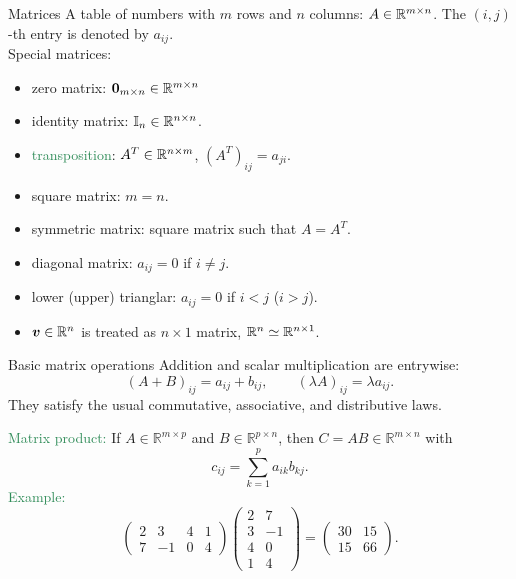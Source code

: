 \documentclass{beamer}
\begin{document}
\begin{frame}{Matrices}
	A table of numbers with $m$ rows and $n$ columns: $A\in \mathbb R^{m\times n}$. The $(i,j)$-th entry is denoted by $a_{ij}$.\\[.3cm]
	Special matrices: 
\begin{itemize}
	\item zero matrix: $\boldsymbol 0_{m\times n}\in \mathbb R^{m\times n}$\\[.2cm]
	\item identity matrix: $\mathbb I_n\in \mathbb R^{n\times n}$.\\[.2cm]
		\item \textcolor{SeaGreen}{transposition}: $A^T\in \mathbb R^{n\times m}$, $(A^T)_{ij}=a_{ji}$.\\[.2cm]
		\item square matrix: $m=n$.\\[.2cm]
		\item symmetric matrix: square matrix such that $A=A^T$.\\[.2cm]
		\item diagonal matrix: $a_{ij}=0$ if $i\neq j$.\\[.2cm]
		\item lower (upper) trianglar: $a_{ij}=0$ if $i<j$ ($i>j$).\\[.2cm]
		\item $\boldsymbol v\in \mathbb R^n$ is treated as $n\times 1$ matrix, $\mathbb R^n\simeq \mathbb R^{n\times 1}$. 
\end{itemize}	
\end{frame}




\begin{frame}{Basic matrix operations}
Addition and scalar multiplication are entrywise:
\[
(A+B)_{ij}=a_{ij}+b_{ij},\qquad (\lambda A)_{ij}=\lambda a_{ij}.
\]
They satisfy the usual commutative, associative, and distributive laws.
\bigskip

\textcolor{SeaGreen}{Matrix product:} If $A\in\mathbb{R}^{m\times p}$ and $B\in\mathbb{R}^{p\times n}$, then $C=AB\in\mathbb{R}^{m\times n}$ with
\[
c_{ij}=\sum_{k=1}^p a_{ik}b_{kj}.
\]
\textcolor{SeaGreen}{Example:}
\[
\begin{pmatrix}2& 3 & 4 & 1\\
7 & -1 & 0 & 4
\end{pmatrix} 
\begin{pmatrix}2& 7\\
3 & -1 \\
4 & 0 \\
1& 4
\end{pmatrix}
=
\begin{pmatrix}30&  15\\
15 & 66
\end{pmatrix}.
\]
\end{frame}
\end{document}
